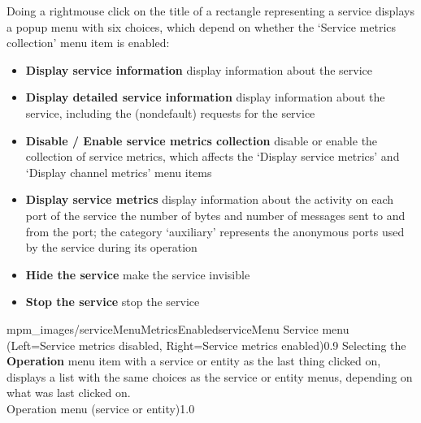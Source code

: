 \clearpage
Doing a right\longDash{}mouse click on the title of a rectangle representing a service
displays a popup menu with six choices, which depend on whether the `Service metrics
collection' menu item is enabled:
\begin{itemize}
\item\textbf{Display service information} display information about the service
\item\exSp\textbf{Display detailed service information} display information about the
service, including the (non\longDash{}default) requests for the service
\item\exSp\textbf{Disable / Enable service metrics collection} disable or enable the
collection of service metrics, which affects the `Display service metrics' and `Display
channel metrics' menu items
\item\exSp\textbf{Display service metrics} display information about the activity on each
port of the service \longDash{} the number of bytes and number of messages sent to and
from the port; the category `auxiliary' represents the anonymous ports used by the service
during its operation
\item\exSp\textbf{Hide the service} make the service invisible
\item\exSp\textbf{Stop the service} stop the service
\end{itemize}
%
{mpm_images/serviceMenuMetricsEnabled}{serviceMenu}%
{Service menu (Left=Service metrics disabled, Right=Service metrics enabled)}{0.9}
\clearpage
Selecting the \textbf{Operation} menu item with a service or entity as the last thing
clicked on, displays a list with the same choices as the service or entity menus,
depending on what was last clicked on.\\
%
{Operation menu (service or entity)}{1.0}

